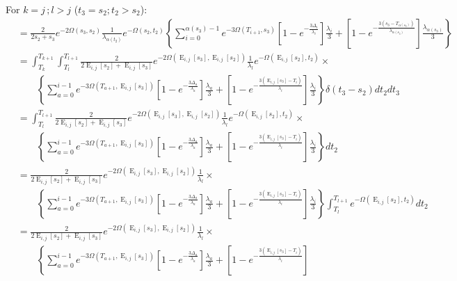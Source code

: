 \documentclass{article}
\DeclareMathOperator{\E}{E}
\begin{document}
For $k = j\,;l>j$ ($t_3=s_2; t_2>s_2$):
\begin{align*}
    &=\frac{2}{2s_2+s_3}e^{-2\Omega(s_3,s_2)}\frac{1}{\lambda_{\alpha(t_2)}}e^{-\Omega(s_2,t_2)}
    \left\{\sum_{i=0}^{\alpha(s_3)-1}e^{-3\Omega(T_{i+1},s_3)}
        \left[1-e^{-\frac{3\Delta_i}{\lambda_i}}\right]\frac{\lambda_i}{3}+
    \left[1-e^{-\frac{3\left(s_3-T_{\alpha(s_3)}\right)}{\lambda_{\alpha(s_3)}}}\right]
        \frac{\lambda_{\alpha(s_3)}}{3}\right\}\\
    &=\int_{T_k}^{T_{k+1}}\int_{T_l}^{T_{l+1}}
    \frac{2}{2\E_{i,j}[s_2]+\E_{i,j}[s_3]}e^{-2\Omega(\E_{i,j}[s_3],\E_{i,j}[s_2])}\frac{1}{\lambda_{l}}e^{-\Omega(\E_{i,j}[s_2],t_2)}\times\\
    &\qquad\left\{\sum_{a=0}^{i-1}e^{-3\Omega(T_{a+1},\E_{i,j}[s_3])}
        \left[1-e^{-\frac{3\Delta_a}{\lambda_a}}\right]\frac{\lambda_a}{3}+
    \left[1-e^{-\frac{3\left(\E_{i,j}[s_3]-T_{i}\right)}{\lambda_{i}}}\right]
        \frac{\lambda_{i}}{3}\right\}\delta(t_3-s_2)dt_2dt_3\\
    &=\int_{T_l}^{T_{l+1}}
    \frac{2}{2\E_{i,j}[s_2]+\E_{i,j}[s_3]}e^{-2\Omega(\E_{i,j}[s_3],\E_{i,j}[s_2])}\frac{1}{\lambda_{l}}e^{-\Omega(\E_{i,j}[s_2],t_2)}\times\\
    &\qquad\left\{\sum_{a=0}^{i-1}e^{-3\Omega(T_{a+1},\E_{i,j}[s_3])}
        \left[1-e^{-\frac{3\Delta_a}{\lambda_a}}\right]\frac{\lambda_a}{3}+
    \left[1-e^{-\frac{3\left(\E_{i,j}[s_3]-T_{i}\right)}{\lambda_{i}}}\right]
        \frac{\lambda_{i}}{3}\right\}dt_2\\
    &=
    \frac{2}{2\E_{i,j}[s_2]+\E_{i,j}[s_3]}e^{-2\Omega(\E_{i,j}[s_3],\E_{i,j}[s_2])}\frac{1}{\lambda_{l}}\times\\
    &\qquad\left\{\sum_{a=0}^{i-1}e^{-3\Omega(T_{a+1},\E_{i,j}[s_3])}
        \left[1-e^{-\frac{3\Delta_a}{\lambda_a}}\right]\frac{\lambda_a}{3}+
    \left[1-e^{-\frac{3\left(\E_{i,j}[s_3]-T_{i}\right)}{\lambda_{i}}}\right]
        \frac{\lambda_{i}}{3}\right\}
        \int_{T_l}^{T_{l+1}}e^{-\Omega(\E_{i,j}[s_2],t_2)}dt_2\\
    &=\frac{2}{2\E_{i,j}[s_2]+\E_{i,j}[s_3]}e^{-2\Omega(\E_{i,j}[s_3],\E_{i,j}[s_2])}\frac{1}{\lambda_{l}}\times\\
    &\qquad\left\{\sum_{a=0}^{i-1}e^{-3\Omega(T_{a+1},\E_{i,j}[s_3])}
        \left[1-e^{-\frac{3\Delta_a}{\lambda_a}}\right]\frac{\lambda_a}{3}+
    \left[1-e^{-\frac{3\left(\E_{i,j}[s_3]-T_{i}\right)}{\lambda_{i}}}\right]

\end{align*}
\end{document}
